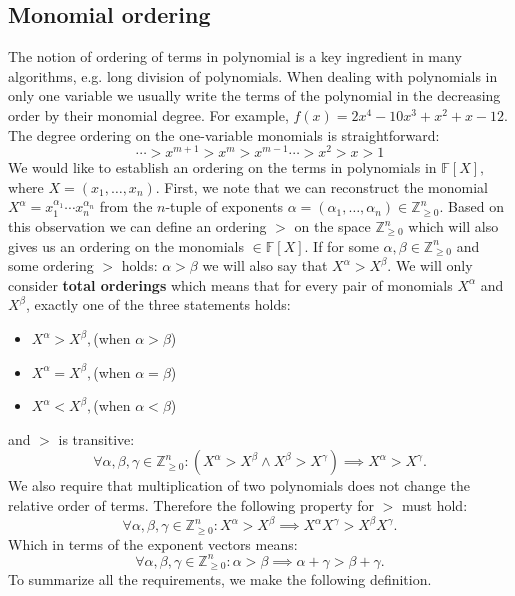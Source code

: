 \documentclass[thesis=M,english]{FITthesis}[2012/10/20]
\theoremstyle{remark}
\theoremstyle{definition}
\begin{document}
\subsection{Monomial ordering}
\noindent The notion of ordering of terms in polynomial is a key ingredient in many algorithms, e.g. long division of polynomials. When dealing with polynomials in only one variable we usually write the terms of the polynomial in the decreasing order by their monomial degree. For example, $f(x) = 2x^4 - 10x^3 + x^2 + x -12$. The degree ordering on the one-variable monomials is straightforward:
$$
\cdots > x^{m+1} > x^m > x^{m-1} \cdots > x^2 > x > 1
$$
We would like to establish an ordering on the terms in polynomials in $\mathbb{F}[X],$ where $X = (x_1, \ldots, x_n)$. First, we note that we can reconstruct the monomial $X^{\alpha} = x_1^{\alpha_1}\cdots x_n^{\alpha_n}$ from the $n$-tuple of exponents $\alpha = (\alpha_1,\ldots, \alpha_n) \in \mathbb{Z}_{\geq 0}^n.$ Based on this observation we can define an ordering $>$ on the space $\mathbb{Z}_{\geq 0}^n$ which will also gives us an ordering on the monomials $\in \mathbb{F}[X].$ If for some $\alpha, \beta \in  \mathbb{Z}_{\geq 0}^n$ and some ordering $>$ holds: $\alpha > \beta$ we will also say that $X^\alpha > X^\beta.$ We will only consider \textbf{total orderings} which means that for every pair of monomials $X^\alpha$ and $X^\beta$, exactly one of the three statements holds:
\begin{itemize}
\item $X^\alpha > X^\beta,$\hfill (when $\alpha > \beta$)
\item $X^\alpha = X^\beta,$\hfill (when $\alpha = \beta$)
\item $X^\alpha < X^\beta,$\hfill (when $\alpha < \beta$)
\end{itemize}
\noindent and $>$ is transitive:
$$
\forall \alpha, \beta, \gamma \in \mathbb{Z}_{\geq 0}^n: (X^\alpha > X^\beta \land X^\beta > X^\gamma) \implies X^\alpha > X^\gamma.
$$
\noindent We also require that multiplication of two polynomials does not change the relative order of terms. Therefore the following property for $>$ must hold:
$$
\forall \alpha, \beta, \gamma \in \mathbb{Z}_{\geq 0}^n: X^\alpha > X^\beta \implies X^\alpha X^\gamma > X^\beta X^\gamma.
$$
\noindent Which in terms of the exponent vectors means: 
$$
\forall \alpha, \beta, \gamma \in \mathbb{Z}_{\geq 0}^n: \alpha > \beta \implies \alpha + \gamma > \beta + \gamma.
$$
\noindent To summarize all the requirements, we make the following definition.
\end{document}
